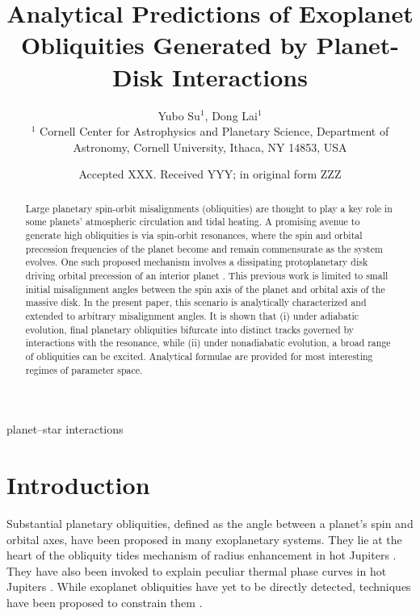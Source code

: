 \documentclass[
        fleqn,
        usenatbib,
    ]{mnras}
\title[Analytical Exoplanet Obliquities]{Analytical Predictions of Exoplanet
Obliquities Generated by Planet-Disk Interactions}
\author[Y. Su and D. Lai]{
Yubo Su$^1$,
Dong Lai$^1$
\\
$^1$ Cornell Center for Astrophysics and Planetary Science, Department of
Astronomy, Cornell University, Ithaca, NY 14853, USA
}
\date{Accepted XXX\@. Received YYY\@; in original form ZZZ}
\begin{document}
\label{firstpage}
\pagerange{\pageref{firstpage}--\pageref{lastpage}}
\maketitle

\begin{abstract}
    Large planetary spin-orbit misalignments (obliquities) are thought to play a
    key role in some planets' atmospheric circulation and tidal heating. A
    promising avenue to generate high obliquities is via spin-orbit resonances,
    where the spin and orbital precession frequencies of the planet become and
    remain commensurate as the system evolves. One such proposed mechanism
    involves a dissipating protoplanetary disk driving orbital precession of an
    interior planet \citep{millholland_disk}. This previous work is limited to
    small initial misalignment angles between the spin axis of the planet and
    orbital axis of the massive disk. In the present paper, this scenario is
    analytically characterized and extended to arbitrary misalignment angles. It
    is shown that (i) under adiabatic evolution, final planetary obliquities
    bifurcate into distinct tracks governed by interactions with the resonance,
    while (ii) under nonadiabatic evolution, a broad range of obliquities can
    be excited. Analytical formulae are provided for most interesting regimes of
    parameter space.
\end{abstract}

\begin{keywords}
planet--star interactions %
\end{keywords}

\section{Introduction}\label{s:intro}

Substantial planetary obliquities, defined as the angle between a planet's spin
and orbital axes, have been proposed in many exoplanetary systems. They lie at
the heart of the obliquity tides mechanism of radius enhancement in hot Jupiters
\citep{winn_otides, fabrycky_otides, millholland_wasp12b}. They have also been
invoked to explain peculiar thermal phase curves in hot Jupiters \citep[see
e.g.][]{millholland_signatures, ohno_infer_obl}. While exoplanet obliquities
have yet to be directly detected, techniques have been proposed to constrain
them \citep[see e.g.][]{schwarz_infer_obl, rauscher_infer_obl}.
\end{document}
